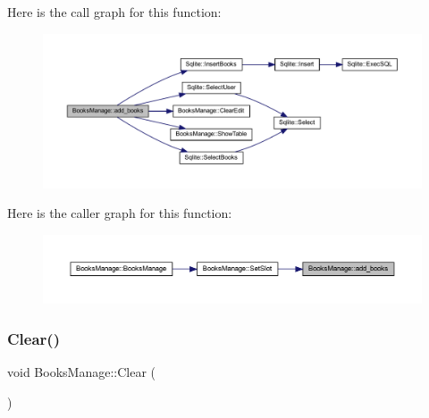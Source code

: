 Here is the call graph for this function\+:
\nopagebreak
\begin{figure}[H]
\begin{center}
\leavevmode
\includegraphics[width=350pt]{class_books_manage_a39c7bdd07e0af93379e1270becd8525c_cgraph}
\end{center}
\end{figure}
Here is the caller graph for this function\+:
\nopagebreak
\begin{figure}[H]
\begin{center}
\leavevmode
\includegraphics[width=350pt]{class_books_manage_a39c7bdd07e0af93379e1270becd8525c_icgraph}
\end{center}
\end{figure}
\mbox{\label{class_books_manage_a8388b6b8547cc759a9976c1a567aab0a}} 
\subsubsection{\texorpdfstring{Clear()}{Clear()}}
{\footnotesize\ttfamily void Books\+Manage\+::\+Clear (\begin{DoxyParamCaption}{ }\end{DoxyParamCaption})}

